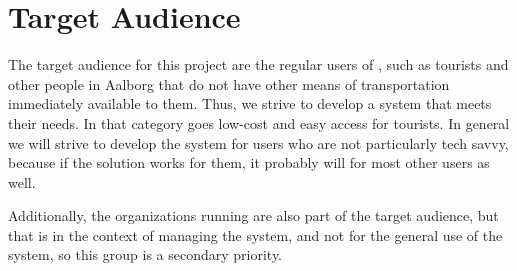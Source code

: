 \section{Target Audience}
The target audience for this project are the regular users of \bycykelwithoutspace, such as tourists and other people in Aalborg that do not have other means of transportation immediately available to them. 
Thus, we strive to develop a system that meets their needs.
In that category goes low-cost and easy access for tourists.
In general we will strive to develop the system for users who are not particularly tech savvy, because if the solution works for them, it probably will for most other users as well.

Additionally, the organizations running \bycykel are also part of the target audience, but that is in the context of managing the system, and not for the general use of the system, so this group is a secondary priority.
